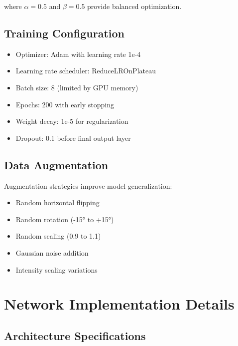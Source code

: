 where $\alpha = 0.5$ and $\beta = 0.5$ provide balanced optimization.

\subsection{Training Configuration}

\begin{itemize}
\item Optimizer: Adam with learning rate 1e-4
\item Learning rate scheduler: ReduceLROnPlateau
\item Batch size: 8 (limited by GPU memory)
\item Epochs: 200 with early stopping
\item Weight decay: 1e-5 for regularization
\item Dropout: 0.1 before final output layer
\end{itemize}

\subsection{Data Augmentation}

Augmentation strategies improve model generalization:
\begin{itemize}
\item Random horizontal flipping
\item Random rotation (-15° to +15°)
\item Random scaling (0.9 to 1.1)
\item Gaussian noise addition
\item Intensity scaling variations
\end{itemize}

\section{Network Implementation Details}

\subsection{Architecture Specifications}

